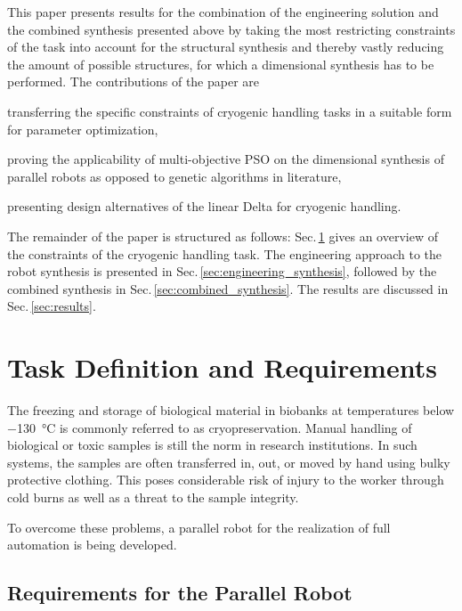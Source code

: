 \documentclass{svproc}
\begin{document}
This paper presents results for the combination of the engineering solution and the combined synthesis presented above by taking the most restricting constraints of the task into account for the structural synthesis and thereby vastly reducing the amount of possible structures, for which a dimensional synthesis has to be performed.
The contributions of the paper are
\begin{compactitem}
\item transferring the specific constraints of cryogenic handling tasks in a suitable form for parameter optimization,
\item proving the applicability of multi-objective PSO on the dimensional synthesis of parallel robots as opposed to genetic algorithms in literature,
\item presenting design alternatives of the linear Delta for cryogenic handling.
\end{compactitem}

The remainder of the paper is structured as follows: 
Sec.\,\ref{sec:taskdef_requ} gives an overview of the constraints of the cryogenic handling task.
The engineering approach to the robot synthesis is presented in Sec.\,\ref{sec:engineering_synthesis}, followed by the combined synthesis in Sec.\,\ref{sec:combined_synthesis}.
The results are discussed in Sec.\,\ref{sec:results}.

\section{Task Definition and Requirements}
\label{sec:taskdef_requ}

The freezing and storage of biological material in biobanks at temperatures below \SI{-130}{\celsius} is commonly referred to as cryopreservation. 
Manual handling of biological or toxic samples is still the norm in research institutions. 
In such systems, the samples are often transferred in, out, or moved by hand using bulky protective clothing. 
This poses considerable risk of injury to the worker through cold burns as well as a threat to the sample integrity. 

To overcome these problems, a parallel robot for the realization of full automation is being developed.

\subsection{Requirements for the Parallel Robot}
\label{sec:req_robot}
\end{document}
